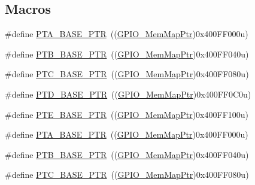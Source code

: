 \subsection*{Macros}
\begin{DoxyCompactItemize}
\item 
\#define \hyperlink{group___g_p_i_o___peripheral_gadf98f6ee2bbfd42102e378a66b29b9ef}{P\+T\+A\+\_\+\+B\+A\+S\+E\+\_\+\+P\+TR}~((\hyperlink{group___g_p_i_o___peripheral_ga31c1eddda45aa085f51142987e05ada5}{G\+P\+I\+O\+\_\+\+Mem\+Map\+Ptr})0x400\+F\+F000u)
\item 
\#define \hyperlink{group___g_p_i_o___peripheral_ga59ab0f28e891ea28f152505ce2021747}{P\+T\+B\+\_\+\+B\+A\+S\+E\+\_\+\+P\+TR}~((\hyperlink{group___g_p_i_o___peripheral_ga31c1eddda45aa085f51142987e05ada5}{G\+P\+I\+O\+\_\+\+Mem\+Map\+Ptr})0x400\+F\+F040u)
\item 
\#define \hyperlink{group___g_p_i_o___peripheral_gaaa3dc05c2a51a960067e1de6863fd3dd}{P\+T\+C\+\_\+\+B\+A\+S\+E\+\_\+\+P\+TR}~((\hyperlink{group___g_p_i_o___peripheral_ga31c1eddda45aa085f51142987e05ada5}{G\+P\+I\+O\+\_\+\+Mem\+Map\+Ptr})0x400\+F\+F080u)
\item 
\#define \hyperlink{group___g_p_i_o___peripheral_gaa61d2c33375f3becbae1353eee4c1317}{P\+T\+D\+\_\+\+B\+A\+S\+E\+\_\+\+P\+TR}~((\hyperlink{group___g_p_i_o___peripheral_ga31c1eddda45aa085f51142987e05ada5}{G\+P\+I\+O\+\_\+\+Mem\+Map\+Ptr})0x400\+F\+F0\+C0u)
\item 
\#define \hyperlink{group___g_p_i_o___peripheral_gaa230685f72ad1540850ab8d12366775c}{P\+T\+E\+\_\+\+B\+A\+S\+E\+\_\+\+P\+TR}~((\hyperlink{group___g_p_i_o___peripheral_ga31c1eddda45aa085f51142987e05ada5}{G\+P\+I\+O\+\_\+\+Mem\+Map\+Ptr})0x400\+F\+F100u)
\item 
\#define \hyperlink{group___g_p_i_o___peripheral_gadf98f6ee2bbfd42102e378a66b29b9ef}{P\+T\+A\+\_\+\+B\+A\+S\+E\+\_\+\+P\+TR}~((\hyperlink{group___g_p_i_o___peripheral_ga31c1eddda45aa085f51142987e05ada5}{G\+P\+I\+O\+\_\+\+Mem\+Map\+Ptr})0x400\+F\+F000u)
\item 
\#define \hyperlink{group___g_p_i_o___peripheral_ga59ab0f28e891ea28f152505ce2021747}{P\+T\+B\+\_\+\+B\+A\+S\+E\+\_\+\+P\+TR}~((\hyperlink{group___g_p_i_o___peripheral_ga31c1eddda45aa085f51142987e05ada5}{G\+P\+I\+O\+\_\+\+Mem\+Map\+Ptr})0x400\+F\+F040u)
\item 
\#define \hyperlink{group___g_p_i_o___peripheral_gaaa3dc05c2a51a960067e1de6863fd3dd}{P\+T\+C\+\_\+\+B\+A\+S\+E\+\_\+\+P\+TR}~((\hyperlink{group___g_p_i_o___peripheral_ga31c1eddda45aa085f51142987e05ada5}{G\+P\+I\+O\+\_\+\+Mem\+Map\+Ptr})0x400\+F\+F080u)

\end{DoxyCompactItemize}

